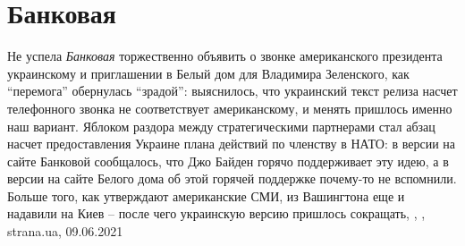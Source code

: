  
 
 
 
 
\chapter{Банковая}

Не успела \emph{Банковая} торжественно объявить о звонке американского
президента украинскому и приглашении в Белый дом для Владимира Зеленского, как
\enquote{перемога} обернулась \enquote{зрадой}: выяснилось, что украинский
текст релиза насчет телефонного звонка не соответствует американскому, и менять
пришлось именно наш вариант.  Яблоком раздора между стратегическими партнерами
стал абзац насчет предоставления Украине плана действий по членству в НАТО: в
версии на сайте Банковой сообщалось, что Джо Байден горячо поддерживает эту
идею, а в версии на сайте Белого дома об этой горячей поддержке почему-то не
вспомнили. Больше того, как утверждают американские СМИ, из Вашингтона еще и
надавили на Киев – после чего украинскую версию пришлось сокращать,
, , strana.ua, 09.06.2021

